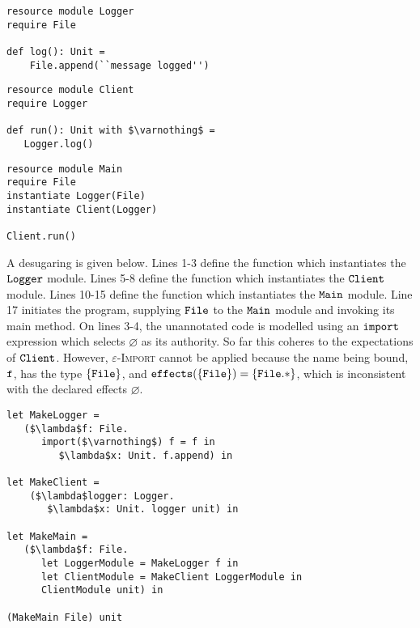 \begin{lstlisting}
resource module Logger
require File

def log(): Unit =
    File.append(``message logged'')
\end{lstlisting}

\begin{lstlisting}
resource module Client
require Logger

def run(): Unit with $\varnothing$ =
   Logger.log()
\end{lstlisting}

\begin{lstlisting}
resource module Main
require File
instantiate Logger(File)
instantiate Client(Logger)

Client.run()
\end{lstlisting}

A desugaring is given below. Lines 1-3 define the function which instantiates the $\mathtt{Logger}$ module. Lines 5-8 define the function which instantiates the $\mathtt{Client}$ module. Lines 10-15 define the function which instantiates the $\mathtt{Main}$ module. Line 17 initiates the program, supplying $\mathtt{File}$ to the $\mathtt{Main}$ module and invoking its main method. On lines 3-4, the unannotated code is modelled using an $\mathtt{import}$ expression which selects $\varnothing$ as its authority. So far this coheres to the expectations of $\mathtt{Client}$. However, \textsc{$\varepsilon$-Import} cannot be applied because the name being bound, $\mathtt{f}$, has the type $\{ \mathtt{File} \}$, and $\mathtt{effects}(\{ \mathtt{File} \}) = \{ \mathtt{File}.* \}$, which is inconsistent with the declared effects $\varnothing$.

\begin{lstlisting}
let MakeLogger =
   ($\lambda$f: File.
      import($\varnothing$) f = f in
         $\lambda$x: Unit. f.append) in

let MakeClient =
	($\lambda$logger: Logger.
	   $\lambda$x: Unit. logger unit) in

let MakeMain =
   ($\lambda$f: File.
      let LoggerModule = MakeLogger f in
      let ClientModule = MakeClient LoggerModule in
      ClientModule unit) in

(MakeMain File) unit
\end{lstlisting}

